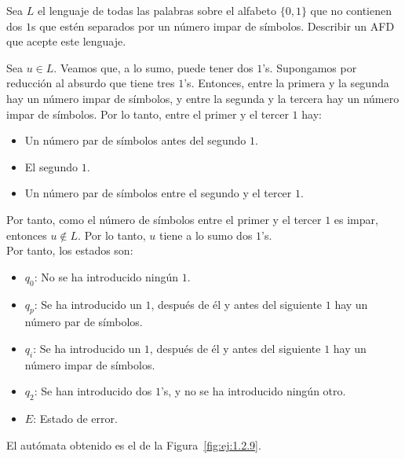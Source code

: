 \begin{ejercicio} \label{ej:1.2.9}
    Sea $L$ el lenguaje de todas las palabras sobre el alfabeto $\{0, 1\}$ que no contienen dos $1$s que estén separados por un número impar de símbolos. Describir un AFD que acepte este lenguaje.

    Sea $u\in L$. Veamos que, a lo sumo, puede tener dos $1$'s. Supongamos por reducción al absurdo que tiene tres $1$'s. Entonces, entre la primera y la segunda hay un número impar de símbolos, y entre la segunda y la tercera hay un número impar de símbolos. Por lo tanto, entre el primer y el tercer $1$ hay:
    \begin{itemize}
        \item Un número par de símbolos antes del segundo $1$.
        \item El segundo $1$.
        \item Un número par de símbolos entre el segundo y el tercer $1$.
    \end{itemize}
    Por tanto, como el número de símbolos entre el primer y el tercer $1$ es impar, entonces $u\notin L$. Por lo tanto, $u$ tiene a lo sumo dos $1$'s.\\

    Por tanto, los estados son:
    \begin{itemize}
        \item $q_0$: No se ha introducido ningún $1$.
        \item $q_{p}$: Se ha introducido un $1$, después de él y antes del siguiente $1$ hay un número par de símbolos.
        \item $q_{i}$: Se ha introducido un $1$, después de él y antes del siguiente $1$ hay un número impar de símbolos.
        \item $q_{2}$: Se han introducido dos $1$'s, y no se ha introducido ningún otro.
        \item $E$: Estado de error.
    \end{itemize}

    El autómata obtenido es el de la Figura~\ref{fig:ej:1.2.9}.
    \begin{figure}
        \centering
\end{figure}
\end{ejercicio}
